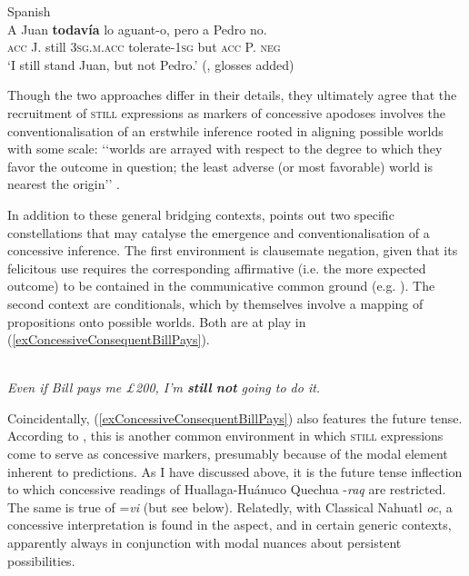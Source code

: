 \begin{exe}
	\ex Spanish\label{exConcessiveConsequentMarginal}\\
	\gll A Juan \textbf{todavía} lo aguant-o, pero a Pedro no.\\
	\textsc{acc} J. still 3\textsc{sg}.\textsc{m}.\textsc{acc} tolerate-1\textsc{sg} but \textsc{acc} P. \textsc{neg}\\
	\glt \lq I still stand Juan, but not Pedro.\rq{ }(\cite[3]{EderlyCurco2016}, glosses added)
\end{exe}

Though the two approaches differ in their details, they ultimately agree that the recruitment of \textsc{still} expressions as markers of concessive apodoses involves the conventionalisation of an erstwhile inference rooted in aligning possible worlds with some scale: \lq\lq worlds are arrayed with respect to the degree to which they favor the outcome in question; the least adverse (or most favorable) world is nearest the origin\rq\rq{ }\parencite[219]{Michaelis1993}.

In addition to these general bridging contexts, \textcite{Koenig1985} points out two specific constellations that may catalyse the emergence and conventionalisation of a concessive inference. The first environment is clausemate negation, given that its felicitous use requires the corresponding affirmative (i.e. the more expected outcome) to be contained in the communicative common ground (e.g. \cite{Givon1978}). The second context are conditionals, which by themselves  involve a mapping of propositions onto possible worlds. Both are at play in (\ref{exConcessiveConsequentBillPays}).

\begin{exe}
	\ex {}\label{exConcessiveConsequentBillPays}\\
	\textit{Even if Bill pays me £200, I'm \textbf{still} \textbf{not} going to do it.} \parencite[194]{Koenig1977}
\end{exe}

Coincidentally, (\ref{exConcessiveConsequentBillPays}) also features the future tense. According to \textcite[141]{vanBaar1991}, this is another common environment in which \textsc{still} expressions come to serve as concessive markers, presumably because of the modal element inherent to predictions. As I have discussed above, it is the future tense inflection to which concessive readings of Huallaga-Huánuco Quechua \mbox{-\textit{raq}} are restricted. The same is true of  \mbox{=\textit{vi}} (but see below). Relatedly, with Classical Nahuatl \textit{oc}, a concessive interpretation is found in the  aspect, and in certain generic contexts, apparently always in conjunction with modal nuances about persistent possibilities.

